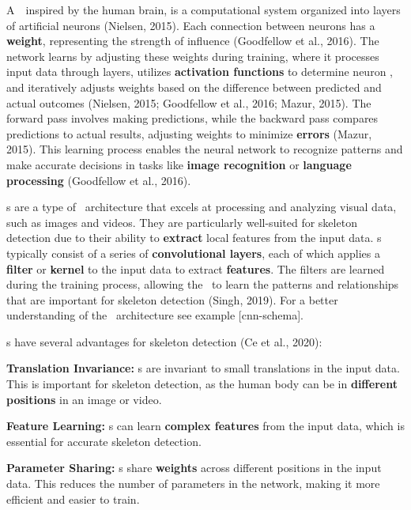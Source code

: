 
A~\NN\, inspired by the human brain, is a computational system organized into layers of artificial neurons (\scc Nielsen, 2015). Each connection between neurons has a {\bf weight}, representing the strength of influence (\scc Goodfellow et al., 2016). The network learns by adjusting these weights during training, where it processes input data through layers, utilizes {\bf activation functions} to determine neuron , and iteratively adjusts weights based on the difference between predicted and actual outcomes (\scc Nielsen, 2015; \scc Goodfellow et al., 2016; \scc Mazur, 2015). The forward pass involves making predictions, while the backward pass compares predictions to actual results, adjusting weights to minimize {\bf errors} (\scc Mazur, 2015). This learning process enables the neural network to recognize patterns and make accurate decisions in tasks like {\bf image recognition} or {\bf language processing} (\scc Goodfellow et al., 2016).

\CNN\-s are a type of \NN\ architecture that excels at processing and analyzing visual data, such as images and videos. They are particularly well-suited for skeleton detection due to their ability to {\bf extract} local features from the input data. \CNN\-s typically consist of a series of {\bf convolutional layers}, each of which applies a {\bf filter} or {\bf kernel} to the input data to extract {\bf features}. The filters are learned during the training process, allowing the \CNN\ to learn the patterns and relationships that are important for skeleton detection (\scc Singh, 2019). For a better understanding of the \CNN\ architecture see example [cnn-schema].

\CNN\-s have several advantages for skeleton detection (\scc Ce et al., 2020):

\startitemize[1]
    \item {\bf Translation Invariance:} \CNN\-s are invariant to small translations in the input data. This is important for skeleton detection, as the human body can be in {\bf different positions} in an image or video.
    \item {\bf Feature Learning:} \CNN\-s can learn {\bf complex features} from the input data, which is essential for accurate skeleton detection.
    \item {\bf Parameter Sharing:} \CNN\-s share {\bf weights} across different positions in the input data. This reduces the number of parameters in the network, making it more efficient and easier to train.
\stopitemize


